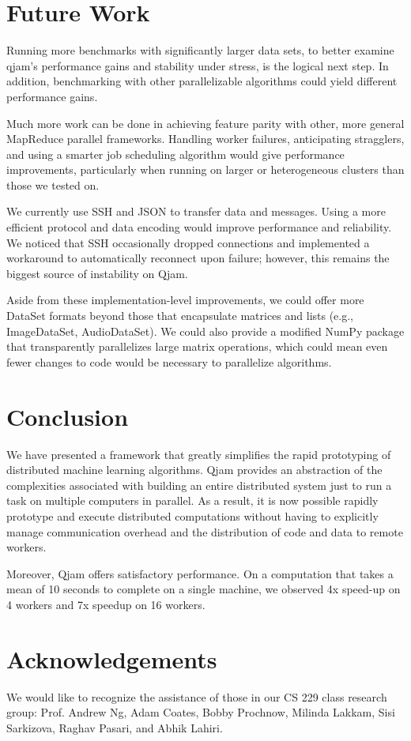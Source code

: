 \documentclass[%
  final,
  notitlepage,
  narroweqnarray,
  inline,
]{ieee}
\begin{document}
\section{Future Work}

Running more benchmarks with significantly larger data sets, to better examine
qjam's performance gains and stability under stress, is the logical next step.
In addition, benchmarking with other parallelizable algorithms could yield
different performance gains.

Much more work can be done in achieving feature parity with other, more general
MapReduce parallel frameworks. Handling worker failures, anticipating
stragglers, and using a smarter job scheduling algorithm would give performance
improvements, particularly when running on larger or heterogeneous clusters
than those we tested on.

We currently use SSH and JSON to transfer data and messages. Using a more
efficient protocol and data encoding would improve performance and
reliability. We noticed that SSH occasionally dropped connections and
implemented a workaround to automatically reconnect upon failure; however, this
remains the biggest source of instability on Qjam.

Aside from these implementation-level improvements, we could offer more DataSet
formats beyond those that encapsulate matrices and lists (e.g., ImageDataSet,
AudioDataSet). We could also provide a modified NumPy package that
transparently parallelizes large matrix operations, which could mean even fewer
changes to code would be necessary to parallelize algorithms.

\section{Conclusion}

We have presented a framework that greatly simplifies the rapid prototyping of
distributed machine learning algorithms. Qjam provides an abstraction of the
complexities associated with building an entire distributed system just to run
a task on multiple computers in parallel. As a result, it is now possible
rapidly prototype and execute distributed computations without having to
explicitly manage communication overhead and the distribution of code and data
to remote workers.

Moreover, Qjam offers satisfactory performance. On a computation that takes a
mean of 10 seconds to complete on a single machine, we observed 4x speed-up on
4 workers and 7x speedup on 16 workers.

\section{Acknowledgements}
We would like to recognize the assistance of those in our CS 229 class research
group: Prof. Andrew Ng, Adam Coates, Bobby Prochnow, Milinda Lakkam, Sisi
Sarkizova, Raghav Pasari, and Abhik Lahiri.




\end{document}
